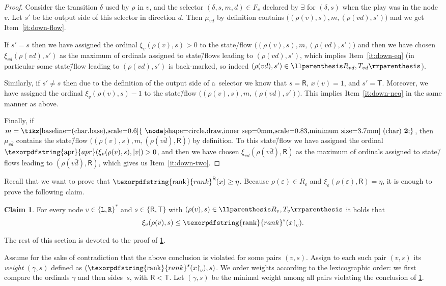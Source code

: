 \documentclass[11pt,a4paper]{amsart}
\theoremstyle{plain}
\theoremstyle{definition}
\newtheorem{clm}[thm]{Claim}
\theoremstyle{defC}
\theoremstyle{thmC}
\theoremstyle{plain}
\numberwithin{equation}{section}
\numberwithin{equation}{section}
\numberwithin{figure}{section}
\newcommand{\ident}[1]{\ensuremath{\texorpdfstring{\mathrm{\mathnm{#1}}}{#1}}\xspace}
\newcommand{\dL}{\mathtt{{\scriptstyle L}}}
\newcommand{\dR}{\mathtt{{\scriptstyle R}}}
\newcommand{\mathnm}[1]{#1}
\newcommand{\restr}{{\upharpoonright}}
\newcommand{\sT}{\mathsf{T}}
\newcommand{\sR}{\mathsf{R}}
\newcommand{\rankX}[1]{\ident{rank}^{#1}}
\newcommand{\rankR}{\ident{rank}^\sR}
\newcommand{\apr}{\ident{apr}}
\renewcommand\epsilon\varepsilon
\newcommand{\eve}{\ensuremath{\exists}\xspace}
\newcommand*\circled[1]{\tikz[baseline=(char.base),scale=0.6]{
            \node[shape=circle,draw,inner sep=0mm,scale=0.83,minimum size=3.7mm] (char) {\textbf{#1}};}}
\newcommand{\fb}{\mathbf{\text{\circled{2}}}}
\DeclarePairedDelimiter{\pair}{\llparenthesis}{\rrparenthesis}
\begin{document}
\begin{proof}	
	Consider the transition $\delta$ used by $\rho$ in $v$,
	and the selector $(\delta,s,m,d)\in F_v$ declared by \eve for $(\delta,s)$ when the play was in the node $v$.
	Let $s'$ be the output side of this selector in direction $d$.
	Then $\mu_{vd}$ by definition contains $\big((\rho(v),s),m,(\rho(vd),s')\big)$ and we get Item~\ref{it:down-flow}.

	If $s'=s$ then we have assigned the ordinal $\xi_v(\rho(v),s)>0$ to the state\=/flow $\big((\rho(v),s),\allowbreak m,\allowbreak (\rho(vd),s')\big)$
	and then we have chosen $\xi_{vd}(\rho(vd),s')$ as the maximum of ordinals assigned to state\=/flows leading to $(\rho(vd),s')$,
	which implies Item~\ref{it:down-eq} (in particular some state\=/flow leading to $(\rho(vd),s')$ is back-marked, so indeed $(\rho(vd),s')\in\pair{R_{vd},T_{vd}}$).
	
	Similarly, if $s'\neq s$ then due to the definition of the output side of a~selector we know that $s=\sR$, $x(v)=1$, and $s'=\sT$.
	Moreover, we have assigned the ordinal $\xi_v(\rho(v),s)-1$ to the state\=/flow $\big((\rho(v),s),m,(\rho(vd),s')\big)$.
	This implies Item~\ref{it:down-neq} in the same manner as above.
	
	Finally, if $m=\fb$, then $\mu_{v\bar{d}}$ contains the state\=/flow $\big((\rho(v),s),m,(\rho(v\bar{d}),\sR)\big)$ by definition.
	To this state\=/flow we have assigned the ordinal $\apr(\xi_v(\rho(v),s),|v|)>0$,
	and then we have chosen $\xi_{v\bar{d}}(\rho(v\bar{d}),\sR)$ as the maximum of ordinals assigned to state\=/flows leading to $(\rho(v\bar{d}),\sR)$,
	which gives us Item~\ref{it:down-two}.
\end{proof}

Recall that we want to prove that $\rankR(x)\geq\eta$.
Because $\rho(\epsilon)\in R_\epsilon$ and $\xi_\epsilon(\rho(\epsilon),\sR)=\eta$, it is enough to prove the following claim.

\begin{clm}
\label{cl:estimate}
	For every node $v\in\{\dL,\dR\}^\ast$ and $s\in\{\sR,\sT\}$ with $(\rho(v),s)\in\pair{R_v,T_v}$ it holds that
	\begin{equation}
	\label{eq:estimate}
	\xi_v(\rho(v),s)\leq\rankX{s}(x\restr_v).
	\end{equation}
\end{clm}

The rest of this section is devoted to the proof of \cref{cl:estimate}.

\noindent %
Assume for the sake of contradiction that the above conclusion is violated for some pairs $(v,s)$.
Assign to each such pair $(v,s)$ its \emph{weight} $(\gamma, s)$ defined as $(\rankX{s}(x\restr_v),s)$.
We order weights according to the lexicographic order: we first compare the ordinals $\gamma$ and then sides~$s$, with $\sR<\sT$.
Let $(\gamma, s)$ be the minimal weight among all pairs violating the conclusion of \cref{cl:estimate}.
\end{document}
